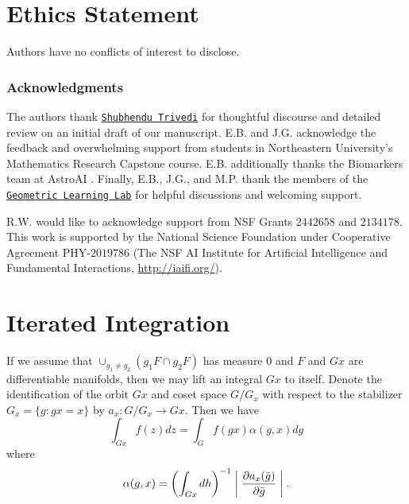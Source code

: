 \documentclass[10pt]{article} %
\theoremstyle{definition}
\begin{document}
\section{Ethics Statement} Authors have no conflicts of interest to disclose. 

\subsubsection*{Acknowledgments}

The authors thank \href{https://shubhendu-trivedi.org/}{\texttt{Shubhendu Trivedi}} for thoughtful discourse and detailed review on an initial draft of our manuscript. E.B. and J.G. acknowledge the feedback and overwhelming support from students in Northeastern University's Mathematics Research Capstone course. E.B. additionally thanks the Biomarkers team at AstroAI \citep{Garraffo2024AstroAI}. Finally, E.B., J.G., and M.P. thank the members of the \href{https://www.robinwalters.com/}{\texttt{Geometric Learning Lab}} for helpful discussions and welcoming support.

R.W. would like to acknowledge support from NSF Grants $2442658$ and $2134178$. This work is supported by the National Science Foundation under Cooperative Agreement PHY-$2019786$ (The NSF AI Institute for Artificial Intelligence and Fundamental Interactions, \url{http://iaifi.org/}).


\newpage




\newpage

\appendix

\section{Iterated Integration} \label{sec:iterated_integral}

If we assume that $\cup_{g_1 \neq g_2} (g_1F \cap g_2F)$ has measure $0$ and $F$ and $Gx$ are differentiable manifolds, then we may lift an integral $Gx$ to itself. Denote the identification of the orbit $Gx$ and coset space $G/G_x$ with respect to the stabilizer $G_x = \{g\colon gx = x\}$ by $a_x\colon G/G_x \to Gx$. Then we have
%
\begin{equation*}
    \int_{Gx}f(z) dz = \int_G f(gx)\alpha(g,x)dg
\end{equation*}
%
where 
\begin{equation*}
    \alpha(g,x) = \left(\int_{Gx}dh\right)^{-1} \biggm|\frac{\partial a_x(\bar{g})}{\partial \bar{g}}\biggm|.
\end{equation*}
%
\end{document}
